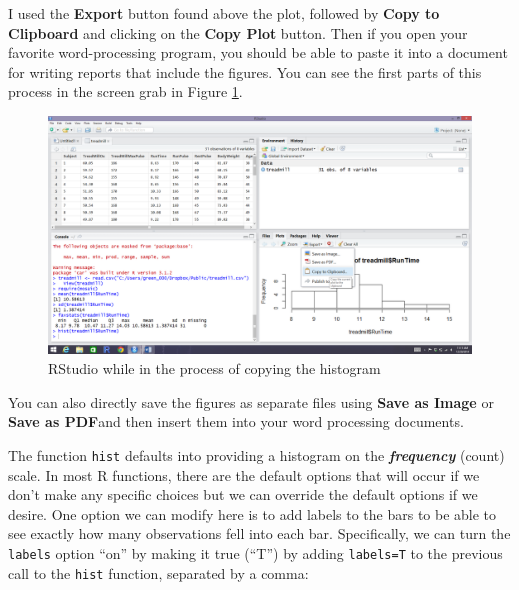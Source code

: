 \documentclass[]{article}
\newenvironment{Shaded}{\begin{snugshade}}{\end{snugshade}}
\newcommand{\KeywordTok}[1]{\textcolor[rgb]{0.13,0.29,0.53}{\textbf{{#1}}}}
\newcommand{\DataTypeTok}[1]{\textcolor[rgb]{0.13,0.29,0.53}{{#1}}}
\newcommand{\NormalTok}[1]{{#1}}
\begin{document}
I used the \textbf{Export} button found above the plot, followed by
\textbf{Copy to Clipboard} and clicking on the \textbf{Copy Plot}
button. Then if you open your favorite word-processing program, you
should be able to paste it into a document for writing reports that
include the figures. You can see the first parts of this process in the
screen grab in Figure \ref{fig:Figure6}.



\begin{figure}
\includegraphics[width=26.67in]{chapter0_files/image010} \caption{RStudio while in the process of copying the histogram}\label{fig:Figure6}
\end{figure}

You can also directly save the figures as separate files using
\textbf{Save as Image} or \textbf{Save as PDF}and then insert them into
your word processing documents.

The function \texttt{hist} defaults into providing a histogram on the
\textbf{\emph{frequency}} (count) scale. In most R functions, there are
the default options that will occur if we don't make any specific
choices but we can override the default options if we desire. One option
we can modify here is to add labels to the bars to be able to see
exactly how many observations fell into each bar. Specifically, we can
turn the \texttt{labels} option ``on'' by making it true (``T'') by
adding \texttt{labels=T} to the previous call to the \texttt{hist}
function, separated by a comma:



\begin{Shaded}
\end{Shaded}
\end{document}
